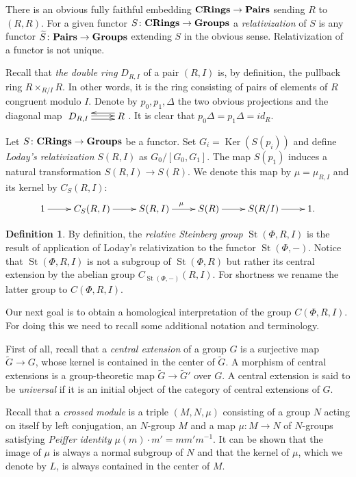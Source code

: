 \documentclass[oneside, 8pt]{amsart}
\theoremstyle{remark}
\theoremstyle{definition}
\numberwithin{lemma}{section}
\numberwithin{prop}{section}
\numberwithin{corollary}{section}
\numberwithin{externaltheorem}{section}
\newtheorem{df}[lemma]{Definition} \Crefname{df}{Definition}{Definitions}
\DeclareMathOperator{\Ker}{Ker}
\DeclareMathOperator{\St}{St}
\newcommand{\catname}[1]{{\normalfont\textbf{#1}}} %
\numberwithin{equation}{section}
\begin{document}
There is an obvious fully faithful embedding $\catname{CRings} \to \catname{Pairs}$ sending $R$ to $(R, R)$. For a given functor $S \colon \catname{CRings} \to \catname{Groups}$ a {\it relativization} of $S$ is any functor $\widetilde{S} \colon \catname{Pairs} \to \catname{Groups}$ extending $S$ in the obvious sense. Relativization of a functor is not unique.

Recall that {\it the double ring} $D_{R, I}$ of a pair $(R, I)$ is, by definition, the pullback ring $R \times_{R/I} R$. In other words, it is the ring consisting of pairs of elements of $R$ congruent modulo $I$. Denote by $p_0, p_1, \Delta$ the two obvious projections and the diagonal map $\xymatrix{D_{R,I} \ar@<1pt>[r] \ar@<-2.5pt>[r] & \ar@<-4pt>[l] R}$. It is clear that $p_0 \Delta = p_1 \Delta = id_{R}$.

Let $S \colon \catname{CRings} \to \catname{Groups}$ be a functor. Set $G_i = \Ker(S(p_i))$ and define {\it Loday's relativization} $S(R, I)$ as $ G_0 / [G_0, G_1]$. The map $S(p_1)$ induces a natural transformation $S(R, I) \to S(R)$. We denote this map by $\mu = \mu_{R,I}$ and its kernel by $C_S(R, I)$: \begin{equation} \label{LodayRelativization} \xymatrix{ 1 \ar[r] & C_S(R, I) \ar[r] & S(R, I) \ar^{\mu}[r] & S(R) \ar[r] & S(R/I) \ar[r] & 1.} \end{equation}

\begin{df} By definition, the {\it relative Steinberg group} $\St(\Phi, R, I)$ is the result of application of Loday's relativization to the functor $\St(\Phi, -)$. Notice that $\St(\Phi, R, I)$ is not a subgroup of $\St(\Phi, R)$ but rather its central extension by the abelian group $C_{\St(\Phi, -)}(R, I)$. For shortness we rename the latter group to $C(\Phi, R, I)$. \end{df}

Our next goal is to obtain a homological interpretation of the group $C(\Phi, R, I)$.
For doing this we need to recall some additional notation and terminology.

First of all, recall that a {\it central extension} of a group $G$ is a surjective map $\widetilde{G} \to G$, whose kernel is contained in the center of $\widetilde{G}$. 
A morphism of central extensions is a group-theoretic map $\widetilde{G} \to \widetilde{G}'$ over $G$.
A central extension is said to be {\it universal} if it is an initial object of the category of central extensions of $G$.

Recall that a {\it crossed module} is a triple $(M, N, \mu)$ consisting of a group $N$ acting on itself by left conjugation, an $N$-group $M$ and a map
 $\mu \colon M\to N$ of $N$-groups satisfying {\it Peiffer identity} $\mu(m) \cdot m' = m m' m^{-1}$. It can be shown that the image of $\mu$ is always
  a normal subgroup of $N$ and that the kernel of $\mu$, which we denote by $L$, is always contained in the center of $M$. %
 
\end{document}

